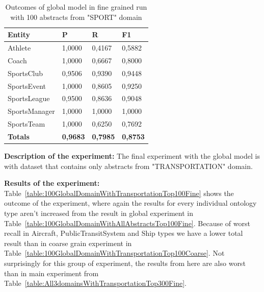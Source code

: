 \documentclass[thesis=M,english]{FITthesis}[2018/05/30]
\begin{document}
	\begin{table}[H]\centering
		\begin{tabular}{|l|l|l|l|}
			\hline {\textbf{Entity}} & {\textbf{P}} & {\textbf{R}} & {\textbf{F1}}\\\hline
				Athlete & 1,0000 & 0,4167 & 0,5882\\
				Coach & 1,0000 & 0,6667 & 0,8000\\
				SportsClub & 0,9506 & 0,9390 & 0,9448\\
				SportsEvent & 1,0000 & 0,8605 & 0,9250\\
				SportsLeague & 0,9500 & 0,8636 & 0,9048\\
				SportsManager & 1,0000 & 1,0000 & 1,0000\\				
				SportsTeam & 1,0000 & 0,6250 & 0,7692\\\hline
				\textbf{Totals} & \textbf{0,9683} & \textbf{0,7985} & \textbf{0,8753}\\\hline
		\end{tabular}
		\caption{Outcomes of global model in fine grained run with 100 abstracts from "SPORT" domain \label{table:100GlobalDomainWithSportTop100Fine}}
	\end{table}	


	\textbf{Description of the experiment:} The final experiment with the global model is with dataset that contains only abstracts from "TRANSPORTATION" domain.

	\textbf{Results of the experiment:} Table~\ref{table:100GlobalDomainWithTransportationTop100Fine} shows the outcome of the experiment, where again the results for every individual ontology type aren't increased from the result in global experiment in Table~\ref{table:100GlobalDomainWithAllAbstractsTop100Fine}. Because of worst recall in Aircraft, PublicTransitSystem and Ship types we have a lower total result than in coarse grain experiment in Table~\ref{table:100GlobalDomainWithTransportationTop100Coarse}. Not surprisingly for this group of experiment, the results from here are also worst than in main experiment from Table~\ref{table:All3domainsWithTransportationTop300Fine}.
\end{document}
